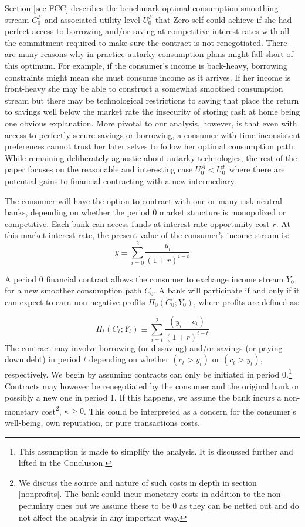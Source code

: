 \documentclass[11pt,english]{article}
\theoremstyle{plain}
\theoremstyle{definition}
\begin{document}
Section \ref{sec-FCC} describes the benchmark optimal consumption
smoothing stream $C_{0}^{F}$ and associated utility level $U_{0}^{F}$
that Zero-self could achieve if she had perfect access to borrowing
and/or saving at competitive interest rates with all the commitment
required to make sure the contract is not renegotiated. There are
many reasons why in practice autarky consumption plans might fall
short of this optimum. For example, if the consumer's income is back-heavy,
borrowing constraints might mean she must consume income as it arrives.
If her income is front-heavy she may be able to construct a somewhat
smoothed consumption stream but there may be technological restrictions
to saving that place the return to savings well below the market rate
\textendash{} the insecurity of storing cash at home being one obvious
explanation. More pivotal to our analysis, however, is that even with
access to perfectly secure savings or borrowing, a consumer with time-inconsistent
preferences cannot trust her later selves to follow her optimal consumption
path. While remaining deliberately agnostic about autarky technologies,
the rest of the paper focuses on the reasonable and interesting case
$U_{0}^{A}<U_{0}^{F}$ where there are potential gains to financial
contracting with a new intermediary.

The consumer will have the option to contract with one or many risk-neutral
banks, depending on whether the period 0 market structure is monopolized
or competitive. Each bank can access funds at interest rate opportunity
cost $r$. At this market interest rate, the present value of the
consumer's income stream is: 
\begin{equation}
y\equiv\sum\limits _{i=0}^{2}\frac{y_{i}}{\left(1+r\right)^{i-t}}
\end{equation}

A period 0 financial contract allows the consumer to exchange income
stream $Y_{0}$ for a new smoother consumption path $C_{0}$. A bank
will participate if and only if it can expect to earn non-negative
profits $\Pi_{0}(C_{0};Y_{0})$, where profits are defined as:

\begin{equation}
\Pi_{t}(C_{t};Y_{t})\equiv\sum\limits _{i=t}^{2}\frac{\left(y_{i}-c_{i}\right)}{\left(1+r\right)^{i-t}}\label{eq:profit}
\end{equation}
The contract may involve borrowing (or dissaving) and/or savings (or
paying down debt) in period $t$ depending on whether $(c_{t}>y_{t})$
or $(c_{t}>y_{t})$, respectively. We begin by assuming contracts
can only be initiated in period 0.\footnote{This assumption is made to simplify the analysis. It is discussed
further and lifted in the Conclusion.} Contracts may however be renegotiated by the consumer and the original
bank or possibly a new one in period 1. If this happens, we assume
the bank incurs a non-monetary cost\footnote{We discuss the source and nature of such costs in depth in section
\ref{nonprofits}. The bank could incur monetary costs in addition
to the non-pecuniary ones but we assume these to be 0 as they can
be netted out and do not affect the analysis in any important way. }, $\kappa\geq0$. This could be interpreted as a concern for the consumer's
well-being, own reputation, or pure transactions costs.
\end{document}
